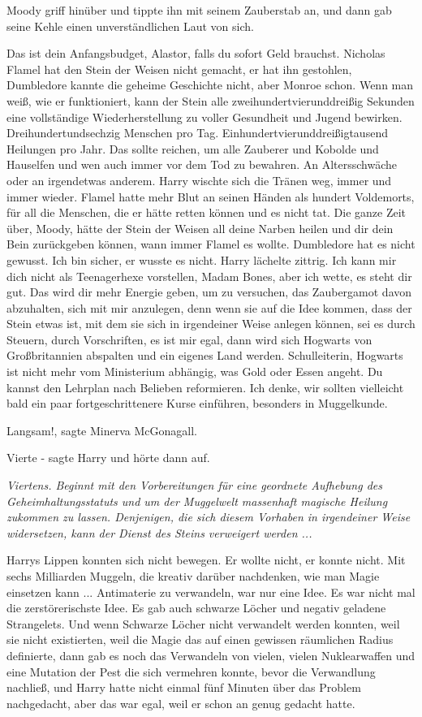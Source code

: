 Moody griff hinüber und tippte ihn mit seinem Zauberstab an, und dann gab seine
Kehle einen unverständlichen Laut von sich.

\glqq{}Das ist dein Anfangsbudget, Alastor, falls du sofort Geld brauchst.
Nicholas Flamel hat den Stein der Weisen nicht gemacht, er hat ihn gestohlen,
Dumbledore kannte die geheime Geschichte nicht, aber Monroe schon. Wenn man
weiß, wie er funktioniert, kann der Stein alle zweihundertvierunddreißig
Sekunden eine vollständige Wiederherstellung zu voller Gesundheit und Jugend
bewirken. Dreihundertundsechzig Menschen pro Tag.
Einhundertvierunddreißigtausend Heilungen pro Jahr. Das sollte reichen, um alle
Zauberer und Kobolde und Hauselfen und wen auch immer vor dem Tod zu bewahren.
An Altersschwäche oder an irgendetwas anderem.\grqq{} Harry wischte sich die Tränen
weg, immer und immer wieder. \glqq{}Flamel hatte mehr Blut an seinen Händen als
hundert Voldemorts, für all die Menschen, die er hätte retten können und es
nicht tat. Die ganze Zeit über, Moody, hätte der Stein der Weisen all deine
Narben heilen und dir dein Bein zurückgeben können, wann immer Flamel es wollte.
Dumbledore hat es nicht gewusst. Ich bin sicher, er wusste es nicht.\grqq{} Harry
lächelte zittrig. \glqq{}Ich kann mir dich nicht als Teenagerhexe vorstellen,
Madam Bones, aber ich wette, es steht dir gut. Das wird dir mehr Energie geben,
um zu versuchen, das Zaubergamot davon abzuhalten, sich mit mir anzulegen, denn
wenn sie auf die Idee kommen, dass der Stein etwas ist, mit dem sie sich in
irgendeiner Weise anlegen können, sei es durch Steuern, durch Vorschriften, es
ist mir egal, dann wird sich Hogwarts von Großbritannien abspalten und ein
eigenes Land werden. Schulleiterin, Hogwarts ist nicht mehr vom Ministerium
abhängig, was Gold oder Essen angeht. Du kannst den Lehrplan nach Belieben
reformieren. Ich denke, wir sollten vielleicht bald ein paar fortgeschrittenere
Kurse einführen, besonders in Muggelkunde.\grqq{}

\glqq{}Langsam!\grqq{}, sagte Minerva McGonagall.

\glqq{}Vierte -\grqq{} sagte Harry und hörte dann auf.

\emph{Viertens. Beginnt mit den Vorbereitungen für eine geordnete Aufhebung des
Geheimhaltungsstatuts und um der Muggelwelt massenhaft magische Heilung zukommen
zu lassen. Denjenigen, die sich diesem Vorhaben in irgendeiner Weise
widersetzen, kann der Dienst des Steins verweigert werden ...}

Harrys Lippen konnten sich nicht bewegen. Er wollte nicht, er konnte nicht. Mit
sechs Milliarden Muggeln, die kreativ darüber nachdenken, wie man Magie
einsetzen kann ... Antimaterie zu verwandeln, war nur eine Idee. Es war nicht mal
die zerstörerischste Idee. Es gab auch schwarze Löcher und negativ geladene
Strangelets. Und wenn Schwarze Löcher nicht verwandelt werden konnten, weil sie
nicht existierten, weil die Magie das auf einen gewissen räumlichen Radius
definierte, dann gab es noch das Verwandeln von vielen, vielen Nuklearwaffen und
eine Mutation der Pest die sich vermehren konnte, bevor die Verwandlung
nachließ, und Harry hatte nicht einmal fünf Minuten über das Problem
nachgedacht, aber das war egal, weil er schon an genug gedacht hatte.

